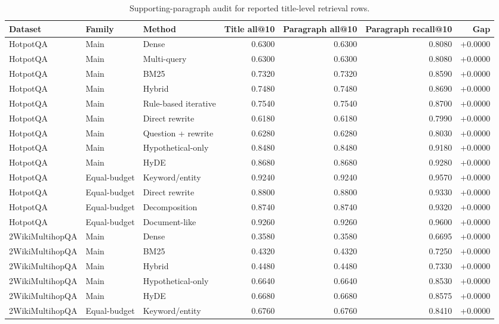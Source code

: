 \begin{table}[t]
\centering
\caption{Supporting-paragraph audit for reported title-level retrieval rows.}
\label{tab:supporting_paragraph_audit}
\scriptsize
\begin{threeparttable}
\setlength{\tabcolsep}{3.5pt}
\begin{tabularx}{\textwidth}{>{\raggedright\arraybackslash}X l l r r r r}
\toprule
Dataset & Family & Method & Title all@10 & Paragraph all@10 & Paragraph recall@10 & Gap \\
\midrule
HotpotQA & Main & Dense & 0.6300 & 0.6300 & 0.8080 & +0.0000 \\
HotpotQA & Main & Multi-query & 0.6300 & 0.6300 & 0.8080 & +0.0000 \\
HotpotQA & Main & BM25 & 0.7320 & 0.7320 & 0.8590 & +0.0000 \\
HotpotQA & Main & Hybrid & 0.7480 & 0.7480 & 0.8690 & +0.0000 \\
HotpotQA & Main & Rule-based iterative & 0.7540 & 0.7540 & 0.8700 & +0.0000 \\
HotpotQA & Main & Direct rewrite & 0.6180 & 0.6180 & 0.7990 & +0.0000 \\
HotpotQA & Main & Question + rewrite & 0.6280 & 0.6280 & 0.8030 & +0.0000 \\
HotpotQA & Main & Hypothetical-only & 0.8480 & 0.8480 & 0.9180 & +0.0000 \\
HotpotQA & Main & HyDE & 0.8680 & 0.8680 & 0.9280 & +0.0000 \\
HotpotQA & Equal-budget & Keyword/entity & 0.9240 & 0.9240 & 0.9570 & +0.0000 \\
HotpotQA & Equal-budget & Direct rewrite & 0.8800 & 0.8800 & 0.9330 & +0.0000 \\
HotpotQA & Equal-budget & Decomposition & 0.8740 & 0.8740 & 0.9320 & +0.0000 \\
HotpotQA & Equal-budget & Document-like & 0.9260 & 0.9260 & 0.9600 & +0.0000 \\
2WikiMultihopQA & Main & Dense & 0.3580 & 0.3580 & 0.6695 & +0.0000 \\
2WikiMultihopQA & Main & BM25 & 0.4320 & 0.4320 & 0.7250 & +0.0000 \\
2WikiMultihopQA & Main & Hybrid & 0.4480 & 0.4480 & 0.7330 & +0.0000 \\
2WikiMultihopQA & Main & Hypothetical-only & 0.6640 & 0.6640 & 0.8530 & +0.0000 \\
2WikiMultihopQA & Main & HyDE & 0.6680 & 0.6680 & 0.8575 & +0.0000 \\
2WikiMultihopQA & Equal-budget & Keyword/entity & 0.6760 & 0.6760 & 0.8410 & +0.0000 \\

\end{tabularx}
\end{threeparttable}
\end{table}
